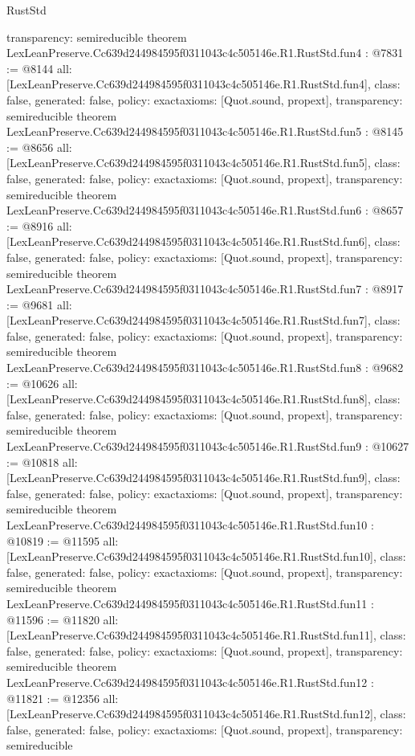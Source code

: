 \begin{lexlean}{RustStd}
\begin{coremodule}
{  transparency: semireducible
}
theorem LexLeanPreserve.Cc639d244984595f0311043c4c505146e.R1.RustStd.fun4 : @7831 := @8144 {
  all: [LexLeanPreserve.Cc639d244984595f0311043c4c505146e.R1.RustStd.fun4],
  class: false,
  generated: false,
  policy: exact{axioms: [Quot.sound, propext]},
  transparency: semireducible
}
theorem LexLeanPreserve.Cc639d244984595f0311043c4c505146e.R1.RustStd.fun5 : @8145 := @8656 {
  all: [LexLeanPreserve.Cc639d244984595f0311043c4c505146e.R1.RustStd.fun5],
  class: false,
  generated: false,
  policy: exact{axioms: [Quot.sound, propext]},
  transparency: semireducible
}
theorem LexLeanPreserve.Cc639d244984595f0311043c4c505146e.R1.RustStd.fun6 : @8657 := @8916 {
  all: [LexLeanPreserve.Cc639d244984595f0311043c4c505146e.R1.RustStd.fun6],
  class: false,
  generated: false,
  policy: exact{axioms: [Quot.sound, propext]},
  transparency: semireducible
}
theorem LexLeanPreserve.Cc639d244984595f0311043c4c505146e.R1.RustStd.fun7 : @8917 := @9681 {
  all: [LexLeanPreserve.Cc639d244984595f0311043c4c505146e.R1.RustStd.fun7],
  class: false,
  generated: false,
  policy: exact{axioms: [Quot.sound, propext]},
  transparency: semireducible
}
theorem LexLeanPreserve.Cc639d244984595f0311043c4c505146e.R1.RustStd.fun8 : @9682 := @10626 {
  all: [LexLeanPreserve.Cc639d244984595f0311043c4c505146e.R1.RustStd.fun8],
  class: false,
  generated: false,
  policy: exact{axioms: [Quot.sound, propext]},
  transparency: semireducible
}
theorem LexLeanPreserve.Cc639d244984595f0311043c4c505146e.R1.RustStd.fun9 : @10627 := @10818 {
  all: [LexLeanPreserve.Cc639d244984595f0311043c4c505146e.R1.RustStd.fun9],
  class: false,
  generated: false,
  policy: exact{axioms: [Quot.sound, propext]},
  transparency: semireducible
}
theorem LexLeanPreserve.Cc639d244984595f0311043c4c505146e.R1.RustStd.fun10 : @10819 := @11595 {
  all: [LexLeanPreserve.Cc639d244984595f0311043c4c505146e.R1.RustStd.fun10],
  class: false,
  generated: false,
  policy: exact{axioms: [Quot.sound, propext]},
  transparency: semireducible
}
theorem LexLeanPreserve.Cc639d244984595f0311043c4c505146e.R1.RustStd.fun11 : @11596 := @11820 {
  all: [LexLeanPreserve.Cc639d244984595f0311043c4c505146e.R1.RustStd.fun11],
  class: false,
  generated: false,
  policy: exact{axioms: [Quot.sound, propext]},
  transparency: semireducible
}
theorem LexLeanPreserve.Cc639d244984595f0311043c4c505146e.R1.RustStd.fun12 : @11821 := @12356 {
  all: [LexLeanPreserve.Cc639d244984595f0311043c4c505146e.R1.RustStd.fun12],
  class: false,
  generated: false,
  policy: exact{axioms: [Quot.sound, propext]},
  transparency: semireducible
}
\end{coremodule}
\end{lexlean}

